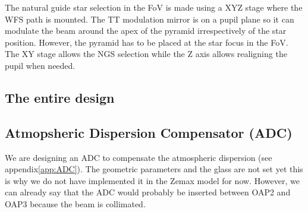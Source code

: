 \documentclass[12pt,a4paper]{article}
\begin{document}
The natural guide star selection in the FoV is made using a XYZ stage where the WFS path is mounted. The TT modulation mirror is on a pupil plane so it can modulate the beam around the apex of the pyramid irrespectively of the star position. However, the pyramid has to be placed at the star focus in the FoV. The XY stage allows the NGS selection while the Z axis allows realigning the pupil when needed.

\subsection{The entire design}



\subsection{Atmopsheric Dispersion Compensator (ADC)}\label{subsec:ADC}
We are designing an ADC to compensate the atmospheric dispersion (see appendix\ref{app:ADC}). The geometric parameters and the glass are not set yet this is why we do not have implemented it in the Zemax model for now. However, we can already say that the ADC would probably be inserted between OAP2 and OAP3 because the beam is collimated.
\newpage

\renewcommand{\bibname}{References}


\end{document}
